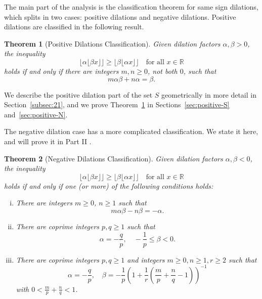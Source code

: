 \documentclass[11pt, letterpaper, reqno]{amsart}
\newtheorem{thm}{Theorem}[section]
\theoremstyle{definition}
\numberwithin{equation}{section}
\newcommand{\RR}{\ensuremath{\mathbb{R}}}
\newcommand{\floor}[1]{\lfloor{#1}\rfloor}
\begin{document}
The main part of the analysis is the  classification theorem for same sign dilations,
which splits in two cases: positive dilations and negative dilations. 
Positive dilations are classified in the following result.

\begin{thm}[Positive Dilations Classification]
\label{thm:positive}
Given dilation factors $\alpha, \beta > 0$, the inequality
\[ 
\floor{\alpha \floor{\beta x}} \geq \floor{\beta \floor{\alpha x}} 
\quad\text{for all }x\in\RR
\]
holds if and only if there are integers $m, n\geq 0$, not both $0$,  such that
\begin{equation}
\label{eq:positive}
m  \alpha \beta + n\alpha = \beta.
\end{equation}
\end{thm}

We describe the positive dilation part of the  set $S$ geometrically 
in more detail in Section~\ref{subsec:21}, 
and we prove Theorem~\ref{thm:positive} in Sections~\ref{sec:positive-S}
and~\ref{sec:positive-N}.

The negative dilation case  has a more complicated classification. We state it here, 
and will prove it  in Part II \cite{LagR:2018b}.
 
\begin{thm}[Negative Dilations Classification]
\label{thm:negative}
Given dilation factors $\alpha, \beta < 0$, the inequality
\[ \floor{\alpha \floor{\beta x}} \geq \floor{\beta \floor{\alpha x}} \quad\text{for all }x\in\RR \]
holds if and only if one (or more) of the following conditions holds:\\

\begin{enumerate}[(i)]
\item\label{it:quad3-a} There are integers $m \geq 0$, $n\geq 1$ such that
\begin{equation}\label{eq:quad3-1}
 m \alpha \beta - n \beta  = -\alpha.
\end{equation}

\item\label{it:quad3-b} There are coprime integers $p,q\geq 1$ such that
\begin{equation}\label{eq:quad3-2}
\alpha = - \frac{q}{p}, \quad  - \frac{1}{p} \leq \beta < 0.
\end{equation}

\item\label{it:quad3-c} There are coprime integers $p, q \geq 1$ and integers $m\geq 0, n\geq 1, r\geq 2$ such that
\begin{equation}\label{eq:quad3-3}
\alpha = -\frac{q}{p}, \quad \beta = -\frac{1}{p}\left(1 + \frac{1}{r}\left(  \frac{m}{p} + \frac{n}{q}-1\right) \right)^{-1}
\end{equation}
with $0< \frac{m}{p} + \frac{n}{q} <1$.
\end{enumerate}
\end{thm}
 
\end{document}
